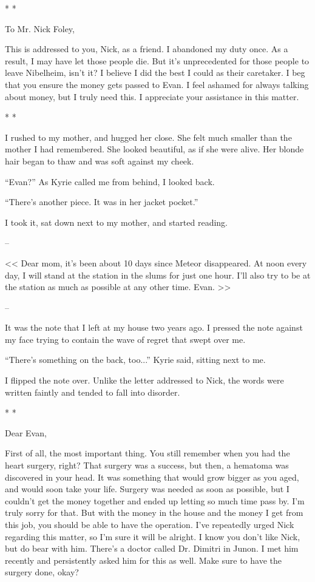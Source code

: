 \documentclass[oneside]{book}
\begin{document}
* *

To Mr. Nick Foley,

This is addressed to you, Nick, as a friend. I abandoned my duty once. As a result, I may have let those people die. But it’s unprecedented for those people to leave Nibelheim, isn’t it? I believe I did the best I could as their caretaker. I beg that you ensure the money gets passed to Evan. I feel ashamed for always talking about money, but I truly need this. I appreciate your assistance in this matter.

* *

I rushed to my mother, and hugged her close. She felt much smaller than the mother I had remembered. She looked beautiful, as if she were alive. Her blonde hair began to thaw and was soft against my cheek.

“Evan?” As Kyrie called me from behind, I looked back.

“There’s another piece. It was in her jacket pocket.”

I took it, sat down next to my mother, and started reading.

–

<< Dear mom, it’s been about 10 days since Meteor disappeared. At noon every day, I will stand at the station in the slums for just one hour. I’ll also try to be at the station as much as possible at any other time. Evan. >>

–

It was the note that I left at my house two years ago. I pressed the note against my face trying to contain the wave of regret that swept over me.

“There’s something on the back, too...” Kyrie said, sitting next to me.

I flipped the note over. Unlike the letter addressed to Nick, the words were written faintly and tended to fall into disorder.

* *

Dear Evan,

First of all, the most important thing. You still remember when you had the heart surgery, right? That surgery was a success, but then, a hematoma was discovered in your head. It was something that would grow bigger as you aged, and would soon take your life. Surgery was needed as soon as possible, but I couldn’t get the money together and ended up letting so much time pass by. I’m truly sorry for that. But with the money in the house and the money I get from this job, you should be able to have the operation. I’ve repeatedly urged Nick regarding this matter, so I’m sure it will be alright. I know you don’t like Nick, but do bear with him. There’s a doctor called Dr. Dimitri in Junon. I met him recently and persistently asked him for this as well. Make sure to have the surgery done, okay?
\end{document}
